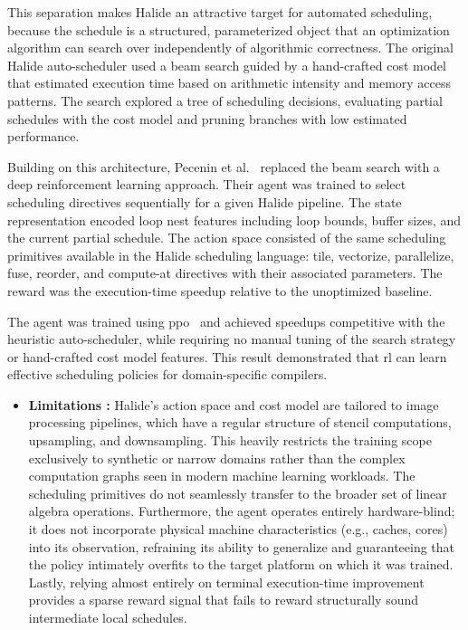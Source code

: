 This separation makes Halide an attractive target for automated scheduling, because the schedule is a structured, parameterized object that an optimization algorithm can search over independently of algorithmic correctness. The original Halide auto-scheduler used a beam search guided by a hand-crafted cost model that estimated execution time based on arithmetic intensity and memory access patterns. The search explored a tree of scheduling decisions, evaluating partial schedules with the cost model and pruning branches with low estimated performance.

Building on this architecture, Pecenin et al.~\cite{pecenin2019halide} replaced the beam search with a deep reinforcement learning approach. Their agent was trained to select scheduling directives sequentially for a given Halide pipeline. The state representation encoded loop nest features including loop bounds, buffer sizes, and the current partial schedule. The action space consisted of the same scheduling primitives available in the Halide scheduling language: tile, vectorize, parallelize, fuse, reorder, and compute-at directives with their associated parameters. The reward was the execution-time speedup relative to the unoptimized baseline.

The agent was trained using \gls{ppo}~\cite{schulman2017ppo} and achieved speedups competitive with the heuristic auto-scheduler, while requiring no manual tuning of the search strategy or hand-crafted cost model features. This result demonstrated that \gls{rl} can learn effective scheduling policies for domain-specific compilers.

\begin{itemize}
\item \textbf{Limitations :} Halide's action space and cost model are tailored to image processing pipelines, which have a regular structure of stencil computations, upsampling, and downsampling. This heavily restricts the training scope exclusively to synthetic or narrow domains rather than the complex computation graphs seen in modern machine learning workloads. The scheduling primitives do not seamlessly transfer to the broader set of linear algebra operations. Furthermore, the agent operates entirely hardware-blind; it does not incorporate physical machine characteristics (e.g., caches, cores) into its observation, refraining its ability to generalize and guaranteeing that the policy intimately overfits to the target platform on which it was trained. Lastly, relying almost entirely on terminal execution-time improvement provides a sparse reward signal that fails to reward structurally sound intermediate local schedules.
\end{itemize}


